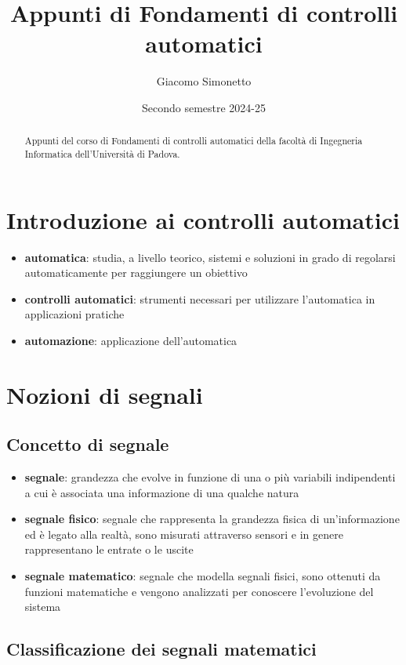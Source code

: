 \documentclass[a4paper]{article}
\title{Appunti di Fondamenti di controlli automatici}
\author{Giacomo Simonetto}
\date{Secondo semestre 2024-25}
\begin{document}
\maketitle
\begin{abstract}
	Appunti del corso di Fondamenti di controlli automatici della facoltà di Ingegneria Informatica dell'Università di Padova.
\end{abstract}

\newpage

\tableofcontents

\newpage

\section{Introduzione ai controlli automatici}
\begin{itemize}
	\item \textbf{automatica}: studia, a livello teorico, sistemi e soluzioni in grado di regolarsi automaticamente per raggiungere un obiettivo
	\item \textbf{controlli automatici}: strumenti necessari per utilizzare l'automatica in applicazioni pratiche
	\item \textbf{automazione}: applicazione dell'automatica
\end{itemize}

\section{Nozioni di segnali}
\subsection{Concetto di segnale}
\begin{itemize}
	\item \textbf{segnale}: grandezza che evolve in funzione di una o più variabili indipendenti a cui è associata una informazione
	di una qualche natura
	\item \textbf{segnale fisico}: segnale che rappresenta la grandezza fisica di un'informazione ed è legato alla realtà, sono
	misurati attraverso sensori e in genere rappresentano le entrate o le uscite
	\item \textbf{segnale matematico}: segnale che modella segnali fisici, sono ottenuti da funzioni matematiche e vengono analizzati
	per conoscere l'evoluzione del sistema
\end{itemize}

\subsection{Classificazione dei segnali matematici}
\end{document}
